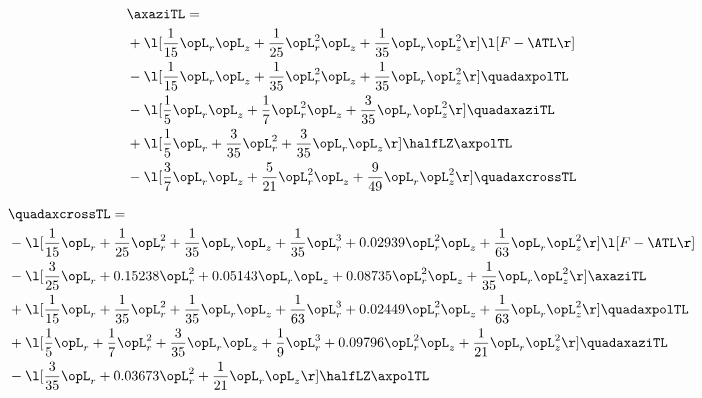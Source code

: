 \begin{alignat}{2} 
\label{eq:linaxaziTL_1} 
& \axaziTL = \\ 
& + \l[ \frac{1}{15} \opL_r \opL_z + \frac{1}{25} \opL_r^{2} \opL_z + \frac{1}{35} \opL_r \opL_z^{2}  \r] \l[ F - \ATL \r] \nonumber \\ 
& - \l[ \frac{1}{15} \opL_r \opL_z + \frac{1}{35} \opL_r^{2} \opL_z + \frac{1}{35} \opL_r \opL_z^{2}  \r] \quadaxpolTL \nonumber \\ 
& - \l[ \frac{1}{5} \opL_r \opL_z + \frac{1}{7} \opL_r^{2} \opL_z + \frac{3}{35} \opL_r \opL_z^{2}  \r] \quadaxaziTL \nonumber \\ 
& + \l[ \frac{1}{5} \opL_r + \frac{3}{35} \opL_r^{2} + \frac{3}{35} \opL_r \opL_z  \r] \halfLZ \axpolTL \nonumber \\ 
& - \l[ \frac{3}{7} \opL_r \opL_z + \frac{5}{21} \opL_r^{2} \opL_z + \frac{9}{49} \opL_r \opL_z^{2}  \r] \quadaxcrossTL \nonumber \\ 
\end{alignat} 


\begin{alignat}{2} 
\label{eq:quadaxcrossTL_1} 
& \quadaxcrossTL = \\ 
& - \l[ \frac{1}{15} \opL_r + \frac{1}{25} \opL_r^{2} + \frac{1}{35} \opL_r \opL_z + \frac{1}{35} \opL_r^{3} +  0.02939 \opL_r^{2} \opL_z + \frac{1}{63} \opL_r \opL_z^{2}  \r] \l[ F - \ATL \r] \nonumber \\ 
& - \l[ \frac{3}{25} \opL_r +  0.15238 \opL_r^{2} +  0.05143 \opL_r \opL_z +  0.08735 \opL_r^{2} \opL_z + \frac{1}{35} \opL_r \opL_z^{2}  \r] \axaziTL \nonumber \\ 
& + \l[ \frac{1}{15} \opL_r + \frac{1}{35} \opL_r^{2} + \frac{1}{35} \opL_r \opL_z + \frac{1}{63} \opL_r^{3} +  0.02449 \opL_r^{2} \opL_z + \frac{1}{63} \opL_r \opL_z^{2}  \r] \quadaxpolTL \nonumber \\ 
& + \l[ \frac{1}{5} \opL_r + \frac{1}{7} \opL_r^{2} + \frac{3}{35} \opL_r \opL_z + \frac{1}{9} \opL_r^{3} +  0.09796 \opL_r^{2} \opL_z + \frac{1}{21} \opL_r \opL_z^{2}  \r] \quadaxaziTL \nonumber \\ 
& - \l[ \frac{3}{35} \opL_r +  0.03673 \opL_r^{2} + \frac{1}{21} \opL_r \opL_z  \r] \halfLZ \axpolTL \nonumber \\ 
\end{alignat} 


